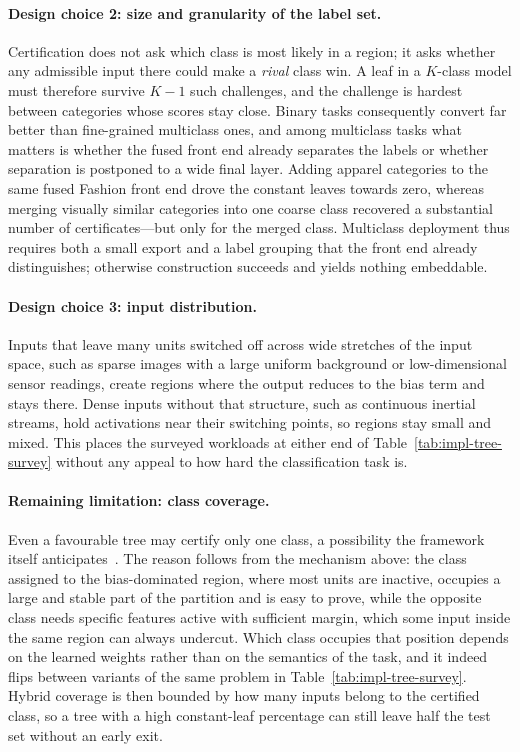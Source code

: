 \paragraph{Design choice 2: size and granularity of the label set.}
Certification does not ask which class is most likely in a region; it asks whether any admissible input there could make a \emph{rival} class win.
A leaf in a \(K\)-class model must therefore survive \(K-1\) such challenges, and the challenge is hardest between categories whose scores stay close.
Binary tasks consequently convert far better than fine-grained multiclass ones, and among multiclass tasks what matters is whether the fused front end already separates the labels or whether separation is postponed to a wide final layer.
Adding apparel categories to the same fused Fashion front end drove the constant leaves towards zero, whereas merging visually similar categories into one coarse class recovered a substantial number of certificates---but only for the merged class.
Multiclass deployment thus requires both a small export and a label grouping that the front end already distinguishes; otherwise construction succeeds and yields nothing embeddable.

\paragraph{Design choice 3: input distribution.}
Inputs that leave many units switched off across wide stretches of the input space, such as sparse images with a large uniform background or low-dimensional sensor readings, create regions where the output reduces to the bias term and stays there.
Dense inputs without that structure, such as continuous inertial streams, hold activations near their switching points, so regions stay small and mixed.
This places the surveyed workloads at either end of Table~\ref{tab:impl-tree-survey} without any appeal to how hard the classification task is.

\paragraph{Remaining limitation: class coverage.}
Even a favourable tree may certify only one class, a possibility the framework itself anticipates~\cite{stein2026nn2logic}.
The reason follows from the mechanism above: the class assigned to the bias-dominated region, where most units are inactive, occupies a large and stable part of the partition and is easy to prove, while the opposite class needs specific features active with sufficient margin, which some input inside the same region can always undercut.
Which class occupies that position depends on the learned weights rather than on the semantics of the task, and it indeed flips between variants of the same problem in Table~\ref{tab:impl-tree-survey}.
Hybrid coverage is then bounded by how many inputs belong to the certified class, so a tree with a high constant-leaf percentage can still leave half the test set without an early exit.

